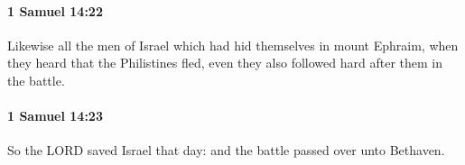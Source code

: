 		\paragraph{1 Samuel 14:22} %
			\label{1SAMUEL-14-22}

			Likewise all the men of Israel which had hid themselves in mount Ephraim, when they heard that the Philistines fled, even they also followed hard after them in the battle.


		\paragraph{1 Samuel 14:23} %
			\label{1SAMUEL-14-23}

			So the LORD saved Israel that day: and the battle passed over unto Bethaven.


